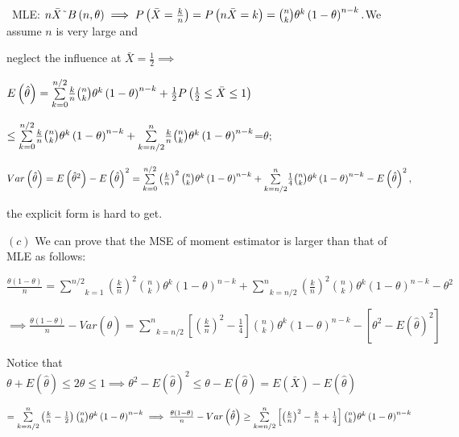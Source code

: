 \documentclass{article}
\begin{document}
\ MLE: $n\bar{X}\symbol{126}B\left( n,\theta \right) \implies P\left( \bar{X}%
=\frac{k}{n}\right) =P\left( n\bar{X}=k\right) =\binom{n}{k}\theta
^{k}\left( 1-\theta \right) ^{n-k}.$We assume $n$ is very large and

neglect the influence at $\bar{X}=\frac{1}{2}\implies $

$\bigskip E\left( \hat{\theta}\right) =\underset{k=0}{\overset{n/2}{\sum }}%
\frac{k}{n}\binom{n}{k}\theta ^{k}\left( 1-\theta \right) ^{n-k}+\frac{1}{2}%
P\left( \frac{1}{2}\leq \bar{X}\leq 1\right) $

$\leq \underset{k=0}{\overset{n/2}{\sum }}\frac{k}{n}\binom{n}{k}\theta
^{k}\left( 1-\theta \right) ^{n-k}+\underset{k=n/2}{\overset{n}{\sum }}\frac{%
k}{n}\binom{n}{k}\theta ^{k}\left( 1-\theta \right) ^{n-k}$=$\theta ;$

$Var\left( \hat{\theta}\right) =E\left( \hat{\theta}^{2}\right) -E\left( 
\hat{\theta}\right) ^{2}=\underset{k=0}{\overset{n/2}{\sum }}\left( \frac{k}{%
n}\right) ^{2}\binom{n}{k}\theta ^{k}\left( 1-\theta \right) ^{n-k}+\underset%
{k=n/2}{\overset{n}{\sum }}\frac{1}{4}\binom{n}{k}\theta ^{k}\left( 1-\theta
\right) ^{n-k}-E\left( \hat{\theta}\right) ^{2},$

the explicit form is hard to get.

$\left( c\right) $ We can prove that the MSE of moment estimator is larger
than that of MLE as follows:

$\frac{\theta \left( 1-\theta \right) }{n}=\underset{k=1}{\overset{n/2}{\sum 
}}\left( \frac{k}{n}\right) ^{2}\binom{n}{k}\theta ^{k}\left( 1-\theta
\right) ^{n-k}+\underset{k=n/2}{\overset{n}{\sum }}\left( \frac{k}{n}\right)
^{2}\binom{n}{k}\theta ^{k}\left( 1-\theta \right) ^{n-k}-\theta ^{2}$

$\implies \frac{\theta \left( 1-\theta \right) }{n}-Var\left( \hat{\theta}%
\right) =\underset{k=n/2}{\overset{n}{\sum }}\left[ \left( \frac{k}{n}%
\right) ^{2}-\frac{1}{4}\right] \binom{n}{k}\theta ^{k}\left( 1-\theta
\right) ^{n-k}-\left[ \theta ^{2}-E\left( \hat{\theta}\right) ^{2}\right] $

Notice that $\theta +E\left( \hat{\theta}\right) \leq 2\theta \leq 1\implies
\theta ^{2}-E\left( \hat{\theta}\right) ^{2}\leq \theta -E\left( \hat{\theta}%
\right) =E\left( \bar{X}\right) -E\left( \hat{\theta}\right) $

$=\underset{k=n/2}{\overset{n}{\sum }}\left( \frac{k}{n}-\frac{1}{2}\right) 
\binom{n}{k}\theta ^{k}\left( 1-\theta \right) ^{n-k}\implies \frac{\theta
\left( 1-\theta \right) }{n}-Var\left( \hat{\theta}\right) \geq \underset{%
k=n/2}{\overset{n}{\sum }}\left[ \left( \frac{k}{n}\right) ^{2}-\frac{k}{n}+%
\frac{1}{4}\right] \binom{n}{k}\theta ^{k}\left( 1-\theta \right) ^{n-k}$
\end{document}
